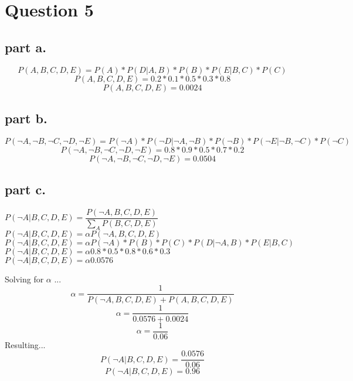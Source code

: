 \section{Question 5}

\subsection{part a.}
\[
P(A,B,C,D,E) = P(A) * P(D | A, B) * P(B) * P(E | B, C) * P(C) \]
\[
P(A,B,C,D,E) = 0.2 * 0.1 * 0.5 * 0.3 * 0.8 \]
\[P(A,B,C,D,E) = 0.0024\]

\subsection{part b.}
\[
P(\neg{A},\neg{B},\neg{C},\neg{D},\neg{E}) = P(\neg{A}) * P(\neg{D} | \neg{A}, \neg{B}) * P(\neg{B}) * P(\neg{E} | \neg{B}, \neg{C}) * P(\neg{C}) \]
\[
P(\neg{A},\neg{B},\neg{C},\neg{D},\neg{E}) = 0.8 * 0.9 * 0.5 * 0.7 * 0.2 \]
\[
P(\neg{A},\neg{B},\neg{C},\neg{D},\neg{E}) = 0.0504
\]
\subsection{part c.}


$ P(\neg{A} | B,C,D,E) = \dfrac{P(\neg{A}, B, C, D, E)}{\sum\limits_{A}^{} P(B, C, D, E)} $ \\
$ P(\neg{A} | B,C,D,E) = \alpha P(\neg{A}, B, C, D, E) $ \\
$ P(\neg{A} | B,C,D,E) = \alpha P(\neg{A}) * P(B) * P(C) * P(D | \neg{A}, B) * P(E | B, C) $ \\
$ P(\neg{A} | B,C,D,E) = \alpha 0.8 * 0.5 * 0.8 * 0.6 * 0.3 $ \\
$ P(\neg{A} | B,C,D,E) = \alpha 0.0576 $ 

\newpage
Solving for $\alpha$ ... \\
\[\alpha = \dfrac{1}{P(\neg{A},B,C,D,E) + P(A,B,C,D,E)} \]
\[\alpha = \dfrac{1}{0.0576 + 0.0024} \]
\[\alpha = \dfrac{1}{0.06}\]
Resulting...\\
\[
P(\neg{A} | B,C,D,E) = \dfrac{0.0576}{0.06} \]
\[P(\neg{A} | B,C,D,E) = 0.96
\]

